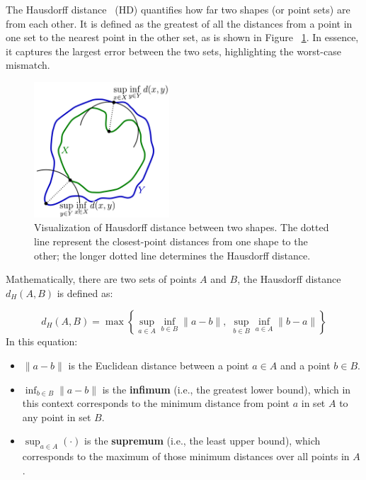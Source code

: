 The Hausdorff distance~\cite{henrikson1999completeness} (HD) quantifies how far two shapes (or point sets) are from each other. It is defined as the greatest of all the distances from a point in one set to the nearest point in the other set, as is shown in Figure ~\ref{fig:hausdorff}. In essence, it captures the largest error between the two sets, highlighting the worst-case mismatch.
\begin{figure}[H]
    \centering
    \includegraphics[width=0.45\textwidth]{PICTURES/haussdorf.png}
    \caption{Visualization of Hausdorff distance between two shapes. The dotted line represent the closest-point distances from one shape to the other; the longer dotted line determines the Hausdorff distance.\cite{wikipediaHausdorff}}
    \label{fig:hausdorff}
\end{figure}

Mathematically, there are two sets of points $A$ and $B$, the Hausdorff distance $d_H(A, B)$ is defined as:

\begin{equation}
d_H(A, B) = \max\left\{ \sup_{a \in A} \inf_{b \in B} \|a - b\|,\; \sup_{b \in B} \inf_{a \in A} \|b - a\| \right\}
\label{eq:hausdorff}
\end{equation}
In this equation:
\begin{itemize}
    \item \( \|a - b\| \) is the Euclidean distance between a point \( a \in A \) and a point \( b \in B \).
    \item \( \inf_{b \in B} \|a - b\| \) is the \textbf{infimum} (i.e., the greatest lower bound), which in this context corresponds to the minimum distance from point \( a \) in set \( A \) to any point in set \( B \).
    \item \( \sup_{a \in A} (\cdot) \) is the \textbf{supremum} (i.e., the least upper bound), which corresponds to the maximum of those minimum distances over all points in \( A \).
\end{itemize}

